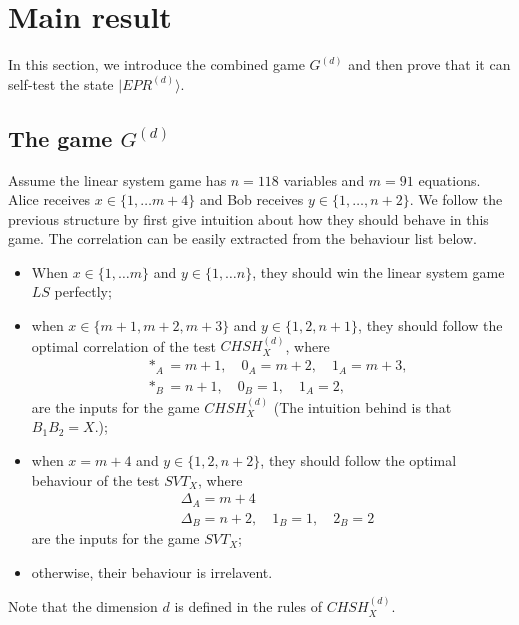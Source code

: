 \documentclass[11pt,letterpaper]{article}
\newcommand{\ket}[1]{|#1\rangle}
\newcommand{\1}{\mathbb{1}}
\newcommand{\CHSH}{CHSH^{(d)}}
\newcommand{\SVT}{SVT}
\newcommand{\EPR}[1]{EPR^{(#1)}}
\newcommand{\G}[1]{G^{(#1)}}
\newcommand{\LS}{LS}
\newcommand{\tri}{\Delta}
\theoremstyle{definition}
\begin{document}
\section{Main result}
\label{sec:main}
In this section, we introduce the combined game $\G{d}$ and then
prove that it can self-test the state $\ket{\EPR{d}}$.

\subsection{The game $\G{d}$}
Assume the linear system game has $n=118$ variables and $m=91$ equations.
Alice receives $x \in \{1,\dots m+4 \}$ and Bob receives
$y \in \{1,\dots,n+2\}$. We follow the previous structure by first give intuition about how they should
behave in this game. The correlation can be easily extracted from the behaviour list below.
\begin{itemize}
	\item When $x \in \{1,\dots m\}$ and $y \in \{1, \dots n\}$, they should win the 
	linear system game $\LS$ perfectly;
	\item when $x \in \{m+1, m+2, m+3\}$ and $y \in \{1, 2, n+1\}$, they should follow the
	optimal correlation of the test $\CHSH_X$, where 
	\begin{align}
		&\ast_A = m+1, \quad 0_A = m+2,\quad 1_A = m+3,\\
		&\ast_B = n+1,\quad 0_B = 1, \quad 1_A = 2,
	\end{align}
	are the inputs for the game $\CHSH_X$
	(The intuition behind is that $B_1B_2 = X$.);
	\item when $x = m+4$ and  $y \in \{1,2,n+2\}$, they should follow the optimal behaviour 
	of the test $\SVT_X$, where
	\begin{align}
		& \tri_A = m+4 \\
		& \tri_B = n+2, \quad 1_B = 1,\quad 2_B = 2
	\end{align}
	are the inputs for the game $\SVT_X$;
	\item otherwise, their behaviour is irrelavent.
\end{itemize}
Note that the dimension $d$ is defined in the rules of $\CHSH_X$.
\end{document}

